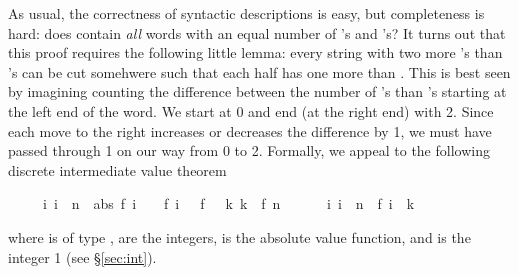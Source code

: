 \begin{isabellebody}
\begin{isamarkuptext}
As usual, the correctness of syntactic descriptions is easy, but completeness
is hard: does  contain \emph{all} words with an equal number of
's and 's? It turns out that this proof requires the
following little lemma: every string with two more 's than 's can be cut somehwere such that each half has one more  than
. This is best seen by imagining counting the difference between the
number of 's than 's starting at the left end of the
word. We start at 0 and end (at the right end) with 2. Since each move to the
right increases or decreases the difference by 1, we must have passed through
1 on our way from 0 to 2. Formally, we appeal to the following discrete
intermediate value theorem 
\begin{isabelle}%
\ \ \ \ \ {\isasymlbrakk}{\isasymforall}i{\isachardot}\ i\ {\isacharless}\ n\ {\isasymlongrightarrow}\ abs\ {\isacharparenleft}f\ {\isacharparenleft}i\ {\isacharplus}\ {}{\isacharparenright}\ {\isacharminus}\ f\ i{\isacharparenright}\ {\isasymle}\ {\isacharhash}{}{\isacharsemicolon}\ f\ {}\ {\isasymle}\ k{\isacharsemicolon}\ k\ {\isasymle}\ f\ n{\isasymrbrakk}\isanewline
\ \ \ \ \ {\isasymLongrightarrow}\ {\isasymexists}i{\isachardot}\ i\ {\isasymle}\ n\ {\isasymand}\ f\ i\ {\isacharequal}\ k%
\end{isabelle}
where  is of type ,  are the integers,
 is the absolute value function, and  is the
integer 1 (see \S\ref{sec:int}).


\end{isamarkuptext}
\end{isabellebody}
